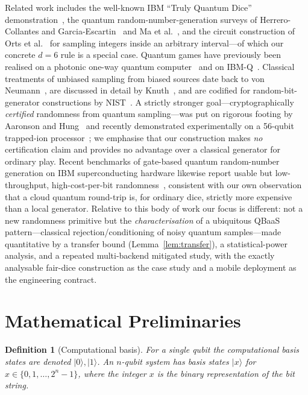 \documentclass{ieeeaccess}
\newtheorem{definition}{Definition}
\begin{document}
Related work includes the well-known IBM ``Truly Quantum Dice'' demonstration~\cite{ibmq2024dice}, the quantum random-number-generation surveys of Herrero-Collantes and Garcia-Escartin~\cite{herrero2023quantumrng} and Ma et al.~\cite{ma2016quantum}, and the circuit construction of Orts et al.~\cite{orts2023quantum} for sampling integers inside an arbitrary interval---of which our concrete $d=6$ rule is a special case. Quantum games have previously been realised on a photonic one-way quantum computer~\cite{prevedel2007experimental} and on IBM-Q~\cite{galas2020quantum}. Classical treatments of unbiased sampling from biased sources date back to von Neumann~\cite{vonneumann1951various}, are discussed in detail by Knuth~\cite{knuth1997seminumerical}, and are codified for random-bit-generator constructions by NIST~\cite{nist80090c}. A strictly stronger goal---cryptographically \emph{certified} randomness from quantum sampling---was put on rigorous footing by Aaronson and Hung~\cite{aaronson2023certified} and recently demonstrated experimentally on a 56-qubit trapped-ion processor~\cite{liu2025certified}; we emphasise that our construction makes \emph{no} certification claim and provides no advantage over a classical generator for ordinary play. Recent benchmarks of gate-based quantum random-number generation on IBM superconducting hardware likewise report usable but low-throughput, high-cost-per-bit randomness~\cite{louamri2025qrng}, consistent with our own observation that a cloud quantum round-trip is, for ordinary dice, strictly more expensive than a local generator. Relative to this body of work our focus is different: not a new randomness primitive but the \emph{characterisation} of a ubiquitous QBaaS pattern---classical rejection/conditioning of noisy quantum samples---made quantitative by a transfer bound (Lemma~\ref{lem:transfer}), a statistical-power analysis, and a repeated multi-backend mitigated study, with the exactly analysable fair-dice construction as the case study and a mobile deployment as the engineering contract.

\section{Mathematical Preliminaries}

\begin{definition}[Computational basis]
For a single qubit the computational basis states are denoted $|0\rangle,|1\rangle$. An $n$-qubit system has basis states $|x\rangle$ for $x\in\{0,1,\dots,2^n-1\}$, where the integer $x$ is the binary representation of the bit string.
\end{definition}
\end{document}
